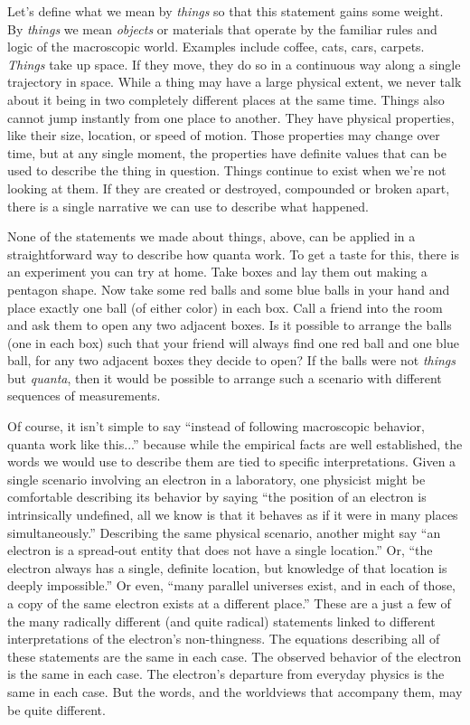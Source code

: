 \documentclass[12pt,onecolumn,preprintnumbers,amsmath,amssymbn,reprint,nofootinbib,superscriptaddress]{revtex4}    %
\begin{document}
Let's define what we mean by {\em things} so that this statement gains some weight.  By {\em things} we mean {\em objects} or materials that operate by the familiar rules and logic of the macroscopic world.  Examples include coffee, cats, cars, carpets.  {\em Things} take up space.  If they move, they do so in a continuous way along a single trajectory in space.  While a thing may have a large physical extent, we never talk about it being in two completely different places at the same time.  Things also cannot jump instantly from one place to another.  They have physical properties, like their size, location, or speed of motion.  Those properties may change over time, but at any single moment, the properties have definite values that can be used to describe the thing in question.  Things continue to exist when we're not looking at them.  If they are created or destroyed, compounded or broken apart, there is a single narrative we can use to describe what happened.  

None of the statements we made about things, above, can be applied in a straightforward way to describe how quanta work.  To get a taste for this, there is an experiment you can try at home. Take boxes and lay them out making a pentagon shape. Now take some red balls and some blue balls in your hand and place exactly one ball (of either color) in each box. Call a friend into the room and ask them to open any two adjacent boxes. Is it possible to arrange the balls (one in each box) such that your friend will always find one red ball and one blue ball, for any two adjacent boxes they decide to open?  If the balls were not \textit{things} but \textit{quanta}, then it would be possible to arrange such a scenario with different sequences of measurements.\cite{Liang}

Of course, it isn't simple to say ``instead of following macroscopic behavior, quanta work like this...''  because while the empirical facts are well established, the words we would use to describe them are tied to specific interpretations. Given a single scenario involving an electron in a laboratory, one physicist might be comfortable describing its behavior by saying ``the position of an electron is intrinsically undefined, all we know is that it behaves as if it were in many places simultaneously.''  Describing the same physical scenario, another might say ``an electron is a spread-out entity that does not have a single location.''  Or, ``the electron always has a single, definite location, but knowledge of that location is deeply impossible.''   Or even, ``many parallel universes exist, and in each of those, a copy of the same electron exists at a different place.'' These are a just a few of the many radically different (and quite radical) statements linked to different interpretations of the electron's non-thingness.  The equations describing all of these statements are the same in each case.  The observed behavior of the electron is the same in each case.  The electron's departure from everyday physics is the same in each case.  But the words, and the worldviews that accompany them, may be quite different. 
\end{document}
